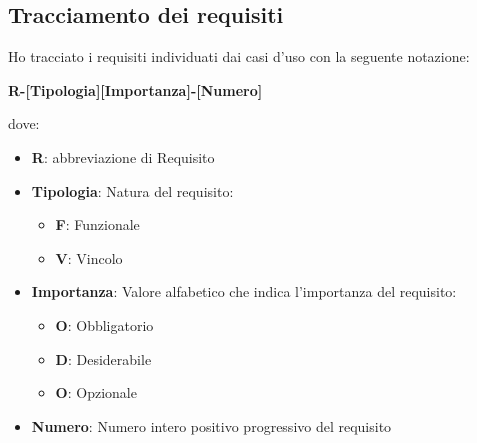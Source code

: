 \subsection{Tracciamento dei requisiti}
Ho tracciato i requisiti individuati dai casi d'uso con la seguente notazione:
\begin{center}
    \textbf{R-[Tipologia][Importanza]-[Numero]}
\end{center}
dove: 
\begin{itemize}
    \item \textbf{R}: abbreviazione di Requisito
    \item \textbf{Tipologia}: Natura del requisito: \begin{itemize}
        \item \textbf{F}: Funzionale
        \item \textbf{V}: Vincolo
    \end{itemize}
    \item \textbf{Importanza}: Valore alfabetico che indica l'importanza del requisito: \begin{itemize}
        \item \textbf{O}: Obbligatorio
        \item \textbf{D}: Desiderabile
        \item \textbf{O}: Opzionale
    \end{itemize}
    \item \textbf{Numero}: Numero intero positivo progressivo del requisito
\end{itemize}

